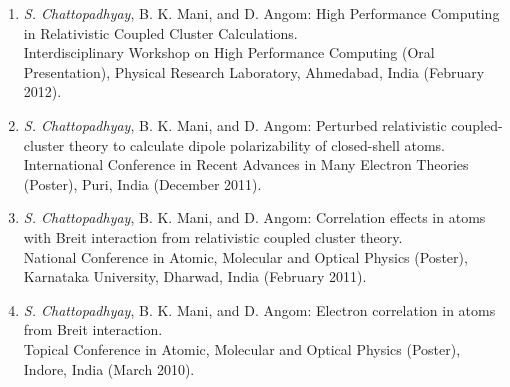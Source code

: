 \documentclass[12pt]{article}
\begin{document}
\begin{enumerate}
  \item {\sl S. Chattopadhyay}, B. K. Mani, and  D. Angom:
        {\sf High Performance Computing in Relativistic Coupled Cluster
             Calculations.} \\
             Interdisciplinary Workshop on High Performance
             Computing (Oral Presentation), Physical Research Laboratory, Ahmedabad, India (February 2012).

  \item {\sl S. Chattopadhyay}, B. K. Mani, and  D. Angom:
        {\sf Perturbed relativistic coupled-cluster theory to calculate dipole
             polarizability of closed-shell atoms.} \\
             International Conference in Recent Advances in Many
             Electron Theories (Poster), Puri, India (December 2011).

  \item {\sl S. Chattopadhyay}, B. K. Mani, and  D. Angom:
        {\sf Correlation effects in atoms with Breit interaction
             from relativistic coupled cluster theory.} \\
             National Conference in Atomic, Molecular and Optical
             Physics (Poster), Karnataka University, Dharwad, India (February 2011).

  \item {\sl S. Chattopadhyay}, B. K. Mani, and  D. Angom:
        {\sf Electron correlation in atoms from Breit interaction.} \\
             Topical Conference in Atomic, Molecular and Optical
             Physics (Poster),  Indore, India  (March 2010).


\end{enumerate}

\end{document}
